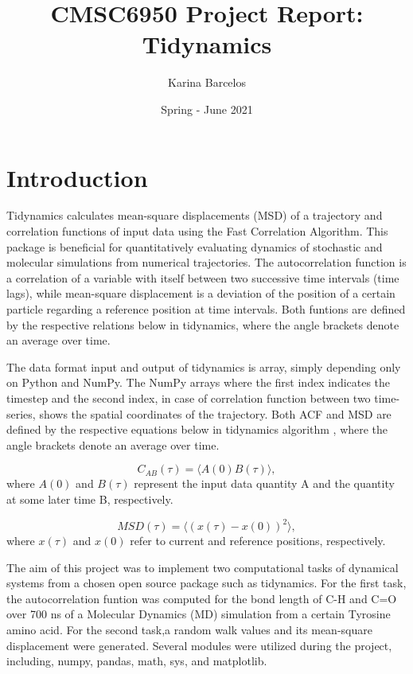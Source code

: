 \documentclass{article}
\title{CMSC6950 Project Report: Tidynamics}
\author{Karina Barcelos}
\date{Spring - June 2021}
\begin{document}
\maketitle

\section{Introduction}

Tidynamics \cite{Buyl2018} calculates mean-square displacements (MSD) of a trajectory and correlation functions of input data using the Fast Correlation Algorithm. \cite{kneller1995nmoldyn} This package is beneficial for quantitatively evaluating dynamics of stochastic and molecular simulations from numerical trajectories. The autocorrelation function is a correlation of a variable with itself between two successive time intervals (time lags), while mean-square displacement is a deviation of the position of a certain particle regarding a reference position at time intervals. Both funtions are defined by the respective relations below in tidynamics, where the angle brackets denote an average over time. \cite{kneller1995nmoldyn}

The data format input and output of tidynamics \cite{Buyl2018} is array, simply depending only on Python and NumPy. The NumPy arrays where the first index indicates the timestep and the second index, in case of correlation function between two time-series, shows the spatial coordinates of the trajectory. Both ACF and MSD are defined by the respective equations below in tidynamics algorithm \cite{Buyl2018}, where the angle brackets denote an average over time. \cite{kneller1995nmoldyn}

\begin{equation}
C_{AB}(\tau) = \langle A(0) B(\tau) \rangle,
\label{correlation}
\end{equation}
where  $A(0)$ and $B(\tau)$ represent the input data quantity A and the quantity at some later time B, respectively.

\begin{equation}
MSD(\tau) = \langle (x(\tau) - x(0) )^2 \rangle,
\label{msd}
\end{equation}
where $x(\tau)$ and $x(0)$ refer to current and reference positions, respectively.


The aim of this project was to implement two computational tasks of dynamical systems from a chosen open source package such as tidynamics\cite{Buyl2018}. For the first task, the autocorrelation funtion was computed for the bond length of C-H and C=O over 700 ns of a Molecular Dynamics (MD) simulation from a certain Tyrosine amino acid. For the second task,a random walk values and its mean-square displacement were generated. Several modules were utilized during the project, including, numpy, pandas, math, sys, and matplotlib. 
\end{document}
